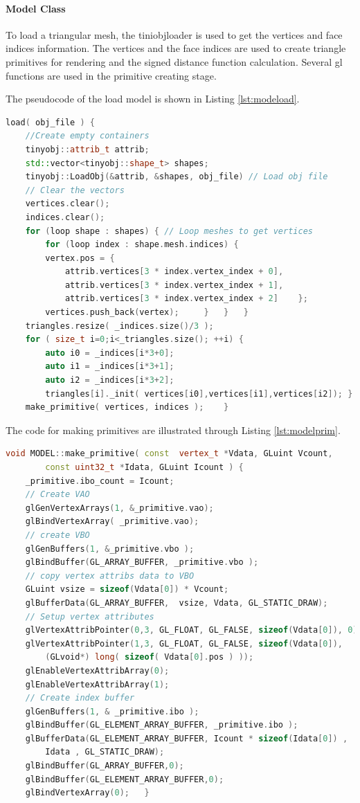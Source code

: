 \paragraph{Model Class}

To load a triangular mesh, the tiniobjloader is used to get the vertices and face indices information. The vertices and the face indices are used to create triangle primitives for rendering and the signed distance function calculation. Several gl functions are used in the primitive creating stage.

The pseudocode of the load model is shown in Listing \ref{lst:modeload}.

\begin{lstlisting}[language=C++, label={lst:modeload}, caption = Pseudocode of model loading]
    load( obj_file ) {
    //Create empty containers
    tinyobj::attrib_t attrib;
    std::vector<tinyobj::shape_t> shapes;
    tinyobj::LoadObj(&attrib, &shapes, obj_file) // Load obj file
    // Clear the vectors
    vertices.clear();
    indices.clear();
    for (loop shape : shapes) { // Loop meshes to get vertices
        for (loop index : shape.mesh.indices) {
        vertex.pos = {
            attrib.vertices[3 * index.vertex_index + 0],
            attrib.vertices[3 * index.vertex_index + 1],
            attrib.vertices[3 * index.vertex_index + 2]    };
        vertices.push_back(vertex);     }   }   }
    triangles.resize( _indices.size()/3 );
    for ( size_t i=0;i<_triangles.size(); ++i) {
        auto i0 = _indices[i*3+0];
        auto i1 = _indices[i*3+1];
        auto i2 = _indices[i*3+2];
        triangles[i]._init( vertices[i0],vertices[i1],vertices[i2]); }
    make_primitive( vertices, indices );    }  
\end{lstlisting}

The code for making primitives are illustrated through Listing \ref{lst:modelprim}.

\begin{lstlisting}[language=C++, label={lst:modelprim}, caption = Function of creating triangular primitives]
void MODEL::make_primitive( const  vertex_t *Vdata, GLuint Vcount, 
        const uint32_t *Idata, GLuint Icount ) {
    _primitive.ibo_count = Icount;
    // Create VAO
    glGenVertexArrays(1, &_primitive.vao);
    glBindVertexArray( _primitive.vao);
    // create VBO
    glGenBuffers(1, &_primitive.vbo );
    glBindBuffer(GL_ARRAY_BUFFER, _primitive.vbo );
    // copy vertex attribs data to VBO
    GLuint vsize = sizeof(Vdata[0]) * Vcount;
    glBufferData(GL_ARRAY_BUFFER,  vsize, Vdata, GL_STATIC_DRAW);
    // Setup vertex attributes
    glVertexAttribPointer(0,3, GL_FLOAT, GL_FALSE, sizeof(Vdata[0]), 0); 
    glVertexAttribPointer(1,3, GL_FLOAT, GL_FALSE, sizeof(Vdata[0]),
        (GLvoid*) long( sizeof( Vdata[0].pos ) ));  
    glEnableVertexAttribArray(0);
    glEnableVertexAttribArray(1);        
    // Create index buffer
    glGenBuffers(1, & _primitive.ibo );
    glBindBuffer(GL_ELEMENT_ARRAY_BUFFER, _primitive.ibo );
    glBufferData(GL_ELEMENT_ARRAY_BUFFER, Icount * sizeof(Idata[0]) ,
        Idata , GL_STATIC_DRAW);  
    glBindBuffer(GL_ARRAY_BUFFER,0);
    glBindBuffer(GL_ELEMENT_ARRAY_BUFFER,0);
    glBindVertexArray(0);   }  
\end{lstlisting}


